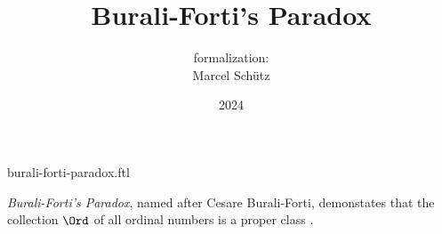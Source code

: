 \documentclass{article}
\title{Burali-Forti's Paradox}
\author{\Naproche formalization:\\[0.5em]Marcel Schütz}
\date{2024}
\begin{document}
\begin{smodule}{burali-forti-paradox.ftl}
  \maketitle
  \hidetlsnumbers

  
  \noindent \emph{Burali-Forti's Paradox}, named after Cesare Burali-Forti, 
  demonstates that the collection $\Ord$ of all ordinal numbers is a
  proper class \cite{BuraliForti1897}.


  \printbibliography
\end{smodule}
\end{document}
